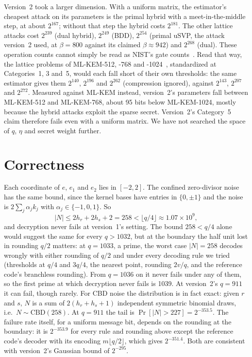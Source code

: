 \documentclass[11pt]{article}
\theoremstyle{remark}
\begin{document}
Version~2 took a larger dimension. With a uniform matrix, the estimator's cheapest attack on its parameters is the
primal hybrid with a meet-in-the-middle step, at about $2^{167}$; without that step the hybrid costs $2^{181}$. The other
lattice attacks cost $2^{239}$ (dual hybrid), $2^{249}$ (BDD), $2^{254}$ (primal uSVP, the attack version~2 used, at
$\beta=800$ against its claimed $\beta\approx942$) and $2^{268}$ (dual). These operation counts cannot simply be read as
NIST's gate counts~\cite{NIST16}. Read that way, the lattice problems of ML-KEM-512, -768 and -1024~\cite{FIPS203},
standardized at Categories~1, 3 and~5, would each fall short of their own thresholds: the same estimator gives them
$2^{140}$, $2^{196}$ and $2^{262}$ (compression ignored), against $2^{143}$, $2^{207}$ and $2^{272}$. Measured against
ML-KEM instead, version~2's parameters fall between ML-KEM-512 and ML-KEM-768, about 95 bits below ML-KEM-1024, mostly
because the hybrid attacks exploit the sparse secret. Version~2's Category~5 claim therefore fails even with a uniform
matrix. We have not searched the space of $q$, $\eta$ and secret weight further.

\section{Correctness}\label{sec:correct}

Each coordinate of $e$, $e_1$ and $e_2$ lies in $[-2,2]$. The confined zero-divisor noise has the same bound, since the
kernel bases have entries in $\{0,\pm1\}$ and the noise is $2\sum_j\alpha_jk_j$ with $\alpha_j\in\{-1,0,1\}$. So
\[
|N|\le 2h_r+2h_s+2=258<\lfloor q/4\rfloor\approx1.07\times10^{9},
\]
and decryption never fails at version~1's setting. The bound $258<q/4$ alone would suggest the same for every $q>1032$,
but at the boundary the half unit lost in rounding $q/2$ matters: at $q=1033$, a prime, the worst case $|N|=258$ decodes
wrongly with either rounding of $q/2$ and under every decoding rule we tried (thresholds at $q/4$ and $3q/4$, the
nearest point, rounding $2v/q$, and the reference code's branchless rounding). From $q=1036$ on it never fails under any
of them, so the first prime at which decryption never fails is 1039. At version~2's $q=911$ it can fail, though rarely.
For CBD noise the distribution is in fact exact: given $r$ and $s$, $N$ is a sum of $2(h_r+h_s+1)$ independent symmetric
binomial draws, i.e.\ $N\sim\mathrm{CBD}(258)$. At $q=911$ the tail is $\Pr[|N|>227]=2^{-353.5}$. The failure rate
itself, for a uniform message bit, depends on the rounding at the boundary: it is $2^{-353.9}$ for every rule and
rounding above except the reference code's decoder with its encoding $m\lfloor q/2\rfloor$, which gives $2^{-351.4}$.
Both are consistent with version~2's Gaussian bound of $2^{-295}$.
\end{document}
